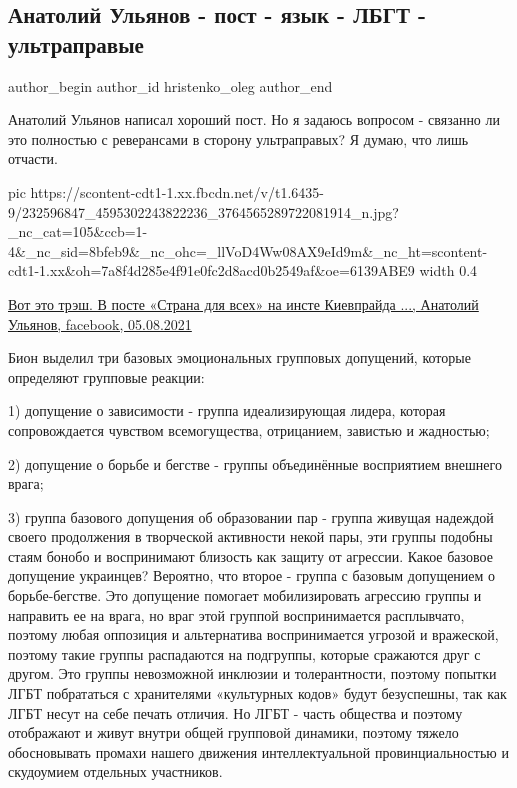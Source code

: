  
 
 
 
 
 
\subsection{Анатолий Ульянов - пост - язык - ЛБГТ - ультраправые}
\label{sec:05_08_2021.fb.hristenko_oleg.1.lbgt_jazyk_post}
 
\ifcmt
 author_begin
   author_id hristenko_oleg
 author_end
\fi

Анатолий Ульянов написал хороший пост. Но я задаюсь вопросом - связанно ли это
полностью с реверансами в сторону ультраправых? Я думаю, что лишь отчасти. 

\ifcmt
  pic https://scontent-cdt1-1.xx.fbcdn.net/v/t1.6435-9/232596847_4595302243822236_3764565289722081914_n.jpg?_nc_cat=105&ccb=1-4&_nc_sid=8bfeb9&_nc_ohc=_llVoD4Ww08AX9eId9m&_nc_ht=scontent-cdt1-1.xx&oh=7a8f4d285e4f91e0fc2d8acd0b2549af&oe=6139ABE9
  width 0.4
\fi

\href{https://www.facebook.com/dadakinder/posts/4595411350477992}{%
Вот это трэш. В посте «Страна для всех» на инсте Киевпрайда ..., Анатолий Ульянов, facebook, 05.08.2021%
}

Бион выделил три базовых эмоциональных групповых допущений, которые определяют
групповые реакции: 

1) допущение о зависимости - группа идеализирующая лидера, которая
сопровождается чувством всемогущества, отрицанием, завистью и жадностью; 

2) допущение о борьбе и бегстве - группы объединённые восприятием внешнего
врага; 


3) группа базового допущения об образовании пар - группа живущая надеждой
своего продолжения в творческой активности некой пары, эти группы подобны стаям
бонобо и воспринимают близость как защиту от агрессии.  Какое базовое допущение
украинцев? Вероятно, что второе - группа с базовым допущением о борьбе-бегстве.
Это допущение помогает мобилизировать агрессию группы и направить ее на врага,
но враг этой группой воспринимается расплывчато, поэтому любая оппозиция и
альтернатива воспринимается угрозой и вражеской, поэтому такие группы
распадаются на подгруппы, которые сражаются друг с другом. Это группы
невозможной инклюзии и толерантности, поэтому попытки ЛГБТ побрататься с
хранителями «культурных кодов» будут безуспешны, так как ЛГБТ несут на себе
печать отличия. Но ЛГБТ - часть общества и поэтому отображают и живут внутри
общей групповой динамики, поэтому тяжело обосновывать промахи нашего движения
интеллектуальной провинциальностью и скудоумием отдельных участников.
